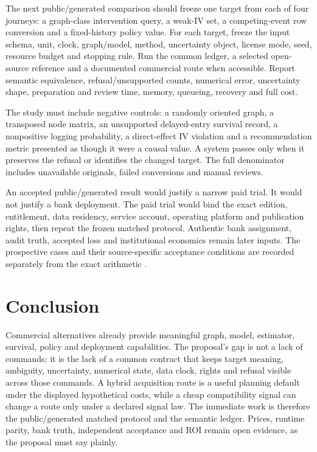 The next public/generated comparison should freeze one target from each of four
journeys: a graph-class intervention query, a weak-IV set, a competing-event
row conversion and a fixed-history policy value. For each target, freeze the
input schema, unit, clock, graph/model, method, uncertainty object, license
mode, seed, resource budget and stopping rule. Run the common ledger, a selected
open-source reference and a documented commercial route when accessible. Report
semantic equivalence, refusal/unsupported counts, numerical error, uncertainty
shape, preparation and review time, memory, queueing, recovery and full cost.

The study must include negative controls: a randomly oriented graph, a
transposed node matrix, an unsupported delayed-entry survival record, a
nonpositive logging probability, a direct-effect IV violation and a recommendation
metric presented as though it were a causal value. A system passes only when it
preserves the refusal or identifies the changed target. The full denominator
includes unavailable originals, failed conversions and manual reviews.

An accepted public/generated result would justify a narrow paid trial. It would
not justify a bank deployment. The paid trial would bind the exact edition,
entitlement, data residency, service account, operating platform and publication
rights, then repeat the frozen matched protocol. Authentic bank assignment,
audit truth, accepted loss and institutional economics remain later inputs.
The prospective cases and their source-specific acceptance conditions are
recorded separately from the exact arithmetic \citep{exec17_s8_design}.

\section{Conclusion}
\label{exec17:s8-end}

Commercial alternatives already provide meaningful graph, model, estimator,
survival, policy and deployment capabilities. The proposal's gap is not a lack
of commands; it is the lack of a common contract that keeps target meaning,
ambiguity, uncertainty, numerical state, data clock, rights and refusal visible
across those commands. A hybrid acquisition route is a useful planning default
under the displayed hypothetical costs, while a cheap compatibility signal can
change a route only under a declared signal law. The immediate work is therefore
the public/generated matched protocol and the semantic ledger. Prices, runtime
parity, bank truth, independent acceptance and ROI remain open evidence, as the
proposal must say plainly.
